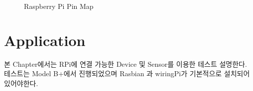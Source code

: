 \documentclass[11pt
  , a4paper
  , article
  , oneside
]{memoir}
\begin{document}
\begin{figure}[h]
  \centering
  \hfill
  \caption{Raspberry Pi Pin Map}
  \label{fig:rpi_pin_map}
\end{figure}

\chapter{Application}
본 Chapter에서는 RPi에 연결 가능한 Device 및 Sensor를 이용한 테스트 설명한다. 테스트는 Model B+에서
진행되었으며 Rasbian 과 wiringPi가 기본적으로 설치되어 있어야한다.
\end{document}
